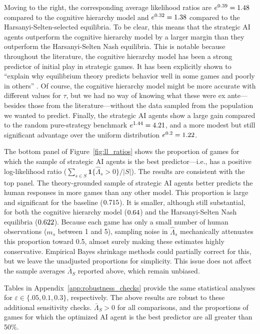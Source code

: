 \documentclass[11pt]{article}
\theoremstyle{definition}
\newcommand{\aisub}{AI agent}
\begin{document}
Moving to the right, the corresponding average likelihood ratios are $e^{0.39} = 1.48$ compared to the cognitive hierarchy model and $e^{0.32} = 1.38$ compared to the Harsanyi-Selten-selected equilibria.
To be clear, this means that the strategic \aisub{s} outperform the cognitive hierarchy model by a larger margin than they outperform the Harsanyi-Selten Nash equilibria.
This is notable because throughout the literature, the cognitive hierarchy model has been a strong predictor of initial play in strategic games.
It has been explicitly shown to ``explain why equilibrium theory predicts behavior well in some games and poorly in others'' \citep{Camerer2004Cognitive}.
Of course, the cognitive hierarchy model might be more accurate with different values for $\tau$, but we had no way of knowing what these were ex ante---besides those from the literature---without the data sampled from the population we wanted to predict.
Finally, the strategic \aisub{s} show a large gain compared to the random pure-strategy benchmark $e^{1.44} = 4.21$, and a more modest but still significant advantage over the uniform distribution $e^{0.2} = 1.22$.

The bottom panel of Figure~\ref{fig:ll_ratios} shows the proportion of games for which the sample of strategic \aisub{s} is the best predictor---i.e., has a positive log-likelihood ratio ($\sum_{s \in S} \mathbf 1\{\hat \Lambda_s > 0\} / |S|$).
The results are consistent with the top panel.
The theory-grounded sample of strategic \aisub{s} better predicts the human responses in more games than any other model.
This proportion is large and significant for the baseline ($0.715$).
It is smaller, although still substantial, for both the cognitive hierarchy model ($0.64$) and the Harsanyi-Selten Nash equilibria ($0.622$).
Because each game has only a small number of human observations ($m_s$ between 1 and 5), sampling noise in $\hat\Lambda_s$ mechanically attenuates this proportion toward 0.5, almost surely making these estimates highly conservative.
Empirical Bayes shrinkage methods \citep[see][]{walters2024empirical} could partially correct for this, but we leave the unadjusted proportions for simplicity.
This issue does not affect the sample averages $\bar\Lambda_S$ reported above, which remain unbiased.

Tables in Appendix~\ref{app:robustness_checks} provide the same statistical analyses for $\varepsilon \in \{.05, 0.1, 0.3\}$, respectively.
The above results are robust to these additional sensitivity checks.
$\bar \Lambda_S > 0 $ for all comparisons, and the proportions of games for which the optimized \aisub{} is the best predictor are all greater than 50\%.
\end{document}
